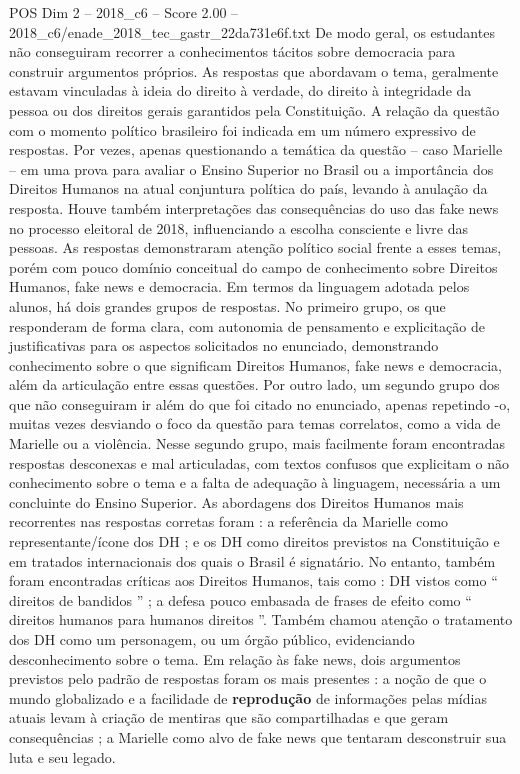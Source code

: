 \begin{textsample}{POS Dim 2 – 2018\_c6 – Score 2.00 – 2018\_c6/enade\_2018\_tec\_gastr\_22da731e6f.txt}
De modo geral, os estudantes não conseguiram recorrer a conhecimentos tácitos sobre democracia para construir argumentos próprios.
As respostas que abordavam o tema, geralmente estavam vinculadas à ideia do direito à verdade, do direito à integridade da pessoa ou dos direitos gerais garantidos pela Constituição.
A relação da questão com o momento político brasileiro foi indicada em um número expressivo de respostas.
Por vezes, apenas questionando a temática da questão – caso Marielle – em uma prova para avaliar o Ensino Superior no Brasil ou a importância dos Direitos Humanos na atual conjuntura política do país, levando à anulação da resposta.
Houve também interpretações das consequências do uso das fake news no processo eleitoral de 2018, influenciando a escolha consciente e livre das pessoas.
As respostas demonstraram atenção político social frente a esses temas, porém com pouco domínio conceitual do campo de conhecimento sobre Direitos Humanos, fake news e democracia.
Em termos da linguagem adotada pelos alunos, há dois grandes grupos de respostas.
No primeiro grupo, os que responderam de forma clara, com autonomia de pensamento e explicitação de justificativas para os aspectos solicitados no enunciado, demonstrando conhecimento sobre o que significam Direitos Humanos, fake news e democracia, além da articulação entre essas questões.
Por outro lado, um segundo grupo dos que não conseguiram ir além do que foi citado no enunciado, apenas repetindo -o, muitas vezes desviando o foco da questão para temas correlatos, como a vida de Marielle ou a violência.
Nesse segundo grupo, mais facilmente foram encontradas respostas desconexas e mal articuladas, com textos confusos que explicitam o não conhecimento sobre o tema e a falta de adequação à linguagem, necessária a um concluinte do Ensino Superior.
As abordagens dos Direitos Humanos mais recorrentes nas respostas corretas foram : a referência da Marielle como representante/ícone dos DH ; e os DH como direitos previstos na Constituição e em tratados internacionais dos quais o Brasil é signatário.
No entanto, também foram encontradas críticas aos Direitos Humanos, tais como : DH vistos como “ direitos de bandidos ” ; a defesa pouco embasada de frases de efeito como “ direitos humanos para humanos direitos ”.
Também chamou atenção o tratamento dos DH como um personagem, ou um órgão público, evidenciando desconhecimento sobre o tema.
Em relação às fake news, dois argumentos previstos pelo padrão de respostas foram os mais presentes : a noção de que o mundo globalizado e a facilidade de \textbf{reprodução} de informações pelas mídias atuais levam à criação de mentiras que são compartilhadas e que geram consequências ; a Marielle como alvo de fake news que tentaram desconstruir sua luta e seu legado.

\end{textsample}
